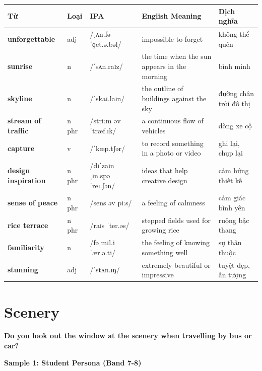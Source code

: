 \vspace{0.8em}
\begin{center}
\renewcommand{\arraystretch}{1.65}
\begin{tabularx}{\textwidth}{|V{0.22\textwidth}|C{0.07\textwidth}|I{0.20\textwidth}|Y|V{0.18\textwidth}|}
\hline
{}
\textbf{Từ} & \textbf{Loại} & \textbf{IPA} & \textbf{English Meaning} & \textbf{Dịch nghĩa} \\
\hline
\textbf{unforgettable} & adj & /ˌʌn.fəˈɡet.ə.bəl/ & impossible to forget & không thể quên \\ \hline
\textbf{sunrise} & n & /ˈsʌn.raɪz/ & the time when the sun appears in the morning & bình minh \\ \hline
\textbf{skyline} & n & /ˈskaɪ.laɪn/ & the outline of buildings against the sky & đường chân trời đô thị \\ \hline
\textbf{stream of traffic} & n phr & /striːm əv ˈtræf.ɪk/ & a continuous flow of vehicles & dòng xe cộ \\ \hline
\textbf{capture} & v & /ˈkæp.tʃər/ & to record something in a photo or video & ghi lại, chụp lại \\ \hline
\textbf{design inspiration} & n phr & /dɪˈzaɪn ˌɪn.spəˈreɪ.ʃən/ & ideas that help creative design & cảm hứng thiết kế \\ \hline
\textbf{sense of peace} & n phr & /sens əv piːs/ & a feeling of calmness & cảm giác bình yên \\ \hline
\textbf{rice terrace} & n phr & /raɪs ˈter.əs/ & stepped fields used for growing rice & ruộng bậc thang \\ \hline
\textbf{familiarity} & n & /fəˌmɪl.iˈær.ə.ti/ & the feeling of knowing something well & sự thân thuộc \\ \hline
\textbf{stunning} & adj & /ˈstʌn.ɪŋ/ & extremely beautiful or impressive & tuyệt đẹp, ấn tượng \\ \hline
\end{tabularx}
\end{center}

\newpage

\section{Scenery}
\begin{ieltsquestion}
\textbf{Do you look out the window at the scenery when travelling by bus or car?}
\end{ieltsquestion}
\textbf{Sample 1: Student Persona (Band 7-8)}

